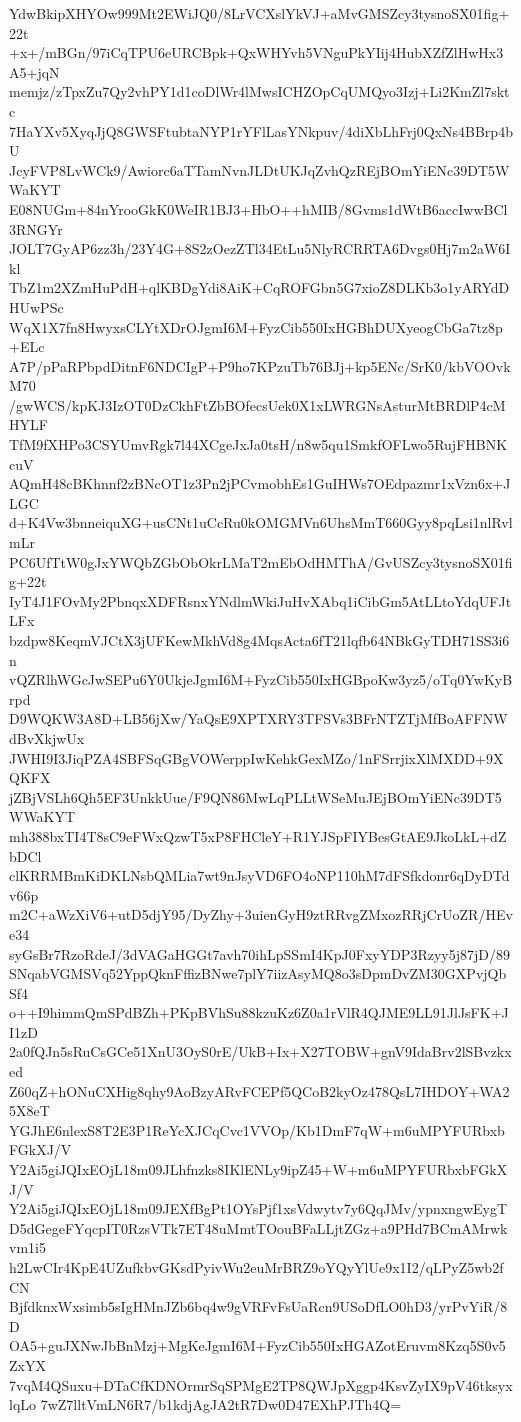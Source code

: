 YdwBkipXHYOw999Mt2EWiJQ0/8LrVCXslYkVJ+aMvGMSZcy3tysnoSX01fig+22t
+x+/mBGn/97iCqTPU6eURCBpk+QxWHYvh5VNguPkYIij4HubXZfZlHwHx3A5+jqN
memjz/zTpxZu7Qy2vhPY1d1coDlWr4lMwsICHZOpCqUMQyo3Izj+Li2KmZl7sktc
7HaYXv5XyqJjQ8GWSFtubtaNYP1rYFlLasYNkpuv/4diXbLhFrj0QxNs4BBrp4bU
JcyFVP8LvWCk9/Awiorc6aTTamNvnJLDtUKJqZvhQzREjBOmYiENc39DT5WWaKYT
E08NUGm+84nYrooGkK0WeIR1BJ3+HbO++hMIB/8Gvms1dWtB6accIwwBCl3RNGYr
JOLT7GyAP6zz3h/23Y4G+8S2zOezZTl34EtLu5NlyRCRRTA6Dvgs0Hj7m2aW6Ikl
TbZ1m2XZmHuPdH+qlKBDgYdi8AiK+CqROFGbn5G7xioZ8DLKb3o1yARYdDHUwPSc
WqX1X7fn8HwyxsCLYtXDrOJgmI6M+FyzCib550IxHGBhDUXyeogCbGa7tz8p+ELc
A7P/pPaRPbpdDitnF6NDCIgP+P9ho7KPzuTb76BJj+kp5ENc/SrK0/kbVOOvkM70
/gwWCS/kpKJ3IzOT0DzCkhFtZbBOfecsUek0X1xLWRGNsAsturMtBRDlP4cMHYLF
TfM9fXHPo3CSYUmvRgk7l44XCgeJxJa0tsH/n8w5qu1SmkfOFLwo5RujFHBNKcuV
AQmH48cBKhnnf2zBNcOT1z3Pn2jPCvmobhEs1GuIHWs7OEdpazmr1xVzn6x+JLGC
d+K4Vw3bnneiquXG+usCNt1uCcRu0kOMGMVn6UhsMmT660Gyy8pqLsi1nlRvlmLr
PC6UfTtW0gJxYWQbZGbObOkrLMaT2mEbOdHMThA/GvUSZcy3tysnoSX01fig+22t
IyT4J1FOvMy2PbnqxXDFRsnxYNdlmWkiJuHvXAbq1iCibGm5AtLLtoYdqUFJtLFx
bzdpw8KeqmVJCtX3jUFKewMkhVd8g4MqsActa6fT21lqfb64NBkGyTDH71SS3i6n
vQZRlhWGcJwSEPu6Y0UkjeJgmI6M+FyzCib550IxHGBpoKw3yz5/oTq0YwKyBrpd
D9WQKW3A8D+LB56jXw/YaQsE9XPTXRY3TFSVs3BFrNTZTjMfBoAFFNWdBvXkjwUx
JWHI9I3JiqPZA4SBFSqGBgVOWerppIwKehkGexMZo/1nFSrrjixXlMXDD+9XQKFX
jZBjVSLh6Qh5EF3UnkkUue/F9QN86MwLqPLLtWSeMuJEjBOmYiENc39DT5WWaKYT
mh388bxTI4T8sC9eFWxQzwT5xP8FHCleY+R1YJSpFIYBesGtAE9JkoLkL+dZbDCl
clKRRMBmKiDKLNsbQMLia7wt9nJsyVD6FO4oNP110hM7dFSfkdonr6qDyDTdv66p
m2C+aWzXiV6+utD5djY95/DyZhy+3uienGyH9ztRRvgZMxozRRjCrUoZR/HEve34
syGsBr7RzoRdeJ/3dVAGaHGGt7avh70ihLpSSmI4KpJ0FxyYDP3Rzyy5j87jD/89
SNqabVGMSVq52YppQknFffizBNwe7plY7iizAsyMQ8o3sDpmDvZM30GXPvjQbSf4
o++I9himmQmSPdBZh+PKpBVhSu88kzuKz6Z0a1rVlR4QJME9LL91JlJsFK+JI1zD
2a0fQJn5sRuCsGCe51XnU3OyS0rE/UkB+Ix+X27TOBW+gnV9IdaBrv2lSBvzkxed
Z60qZ+hONuCXHig8qhy9AoBzyARvFCEPf5QCoB2kyOz478QsL7IHDOY+WA25X8eT
YGJhE6nlexS8T2E3P1ReYcXJCqCvc1VVOp/Kb1DmF7qW+m6uMPYFURbxbFGkXJ/V
Y2Ai5giJQIxEOjL18m09JLhfnzks8IKlENLy9ipZ45+W+m6uMPYFURbxbFGkXJ/V
Y2Ai5giJQIxEOjL18m09JEXfBgPt1OYsPjf1xsVdwytv7y6QqJMv/ypnxngwEygT
D5dGegeFYqcpIT0RzsVTk7ET48uMmtTOouBFaLLjtZGz+a9PHd7BCmAMrwkvm1i5
h2LwCIr4KpE4UZufkbvGKsdPyivWu2euMrBRZ9oYQyYlUe9x1I2/qLPyZ5wb2fCN
BjfdknxWxsimb5sIgHMnJZb6bq4w9gVRFvFsUaRcn9USoDfLO0hD3/yrPvYiR/8D
OA5+guJXNwJbBnMzj+MgKeJgmI6M+FyzCib550IxHGAZotEruvm8Kzq5S0v5ZxYX
7vqM4QSuxu+DTaCfKDNOrmrSqSPMgE2TP8QWJpXggp4KsvZyIX9pV46tksyxlqLo
7wZ7lltVmLN6R7/b1kdjAgJA2tR7Dw0D47EXhPJTh4Q=
